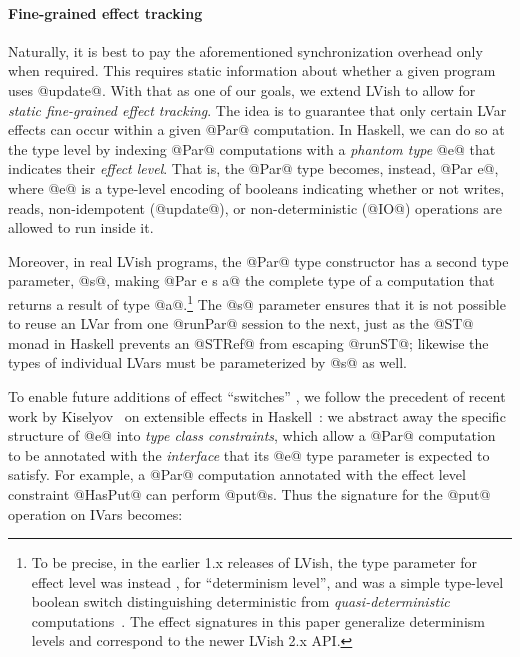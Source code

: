 \paragraph{Fine-grained effect tracking}

Naturally, it is best to pay the aforementioned synchronization
overhead only when required.  This requires static information about
whether a given program uses @update@.  With that as one of our goals, 
we extend LVish
to allow for \emph{static fine-grained effect tracking}.  The idea is
to guarantee that only certain LVar effects can occur within a given
@Par@ computation.  In Haskell, we can do so at the type level
by indexing @Par@ computations with a \emph{phantom type} @e@ that
indicates their \emph{effect level}.  That is, the @Par@ type
 becomes, instead, @Par e@, where @e@ 
is a type-level encoding of booleans indicating whether or not writes,
reads, non-idempotent (@update@), or non-deterministic (@IO@) operations
are allowed to run inside it.

Moreover, in real LVish programs, the @Par@ type constructor has a
second type parameter, @s@, making @Par e s a@ the complete type of a
computation that returns a result of type @a@.\footnote{To be precise,
  in the earlier 1.x releases of LVish, the  type parameter for
  effect level was instead , for ``determinism level'', and was
  a simple type-level boolean switch distinguishing deterministic from
  {\em quasi-deterministic}  computations~\cite{Freeze-paper}.
  The effect signatures in this paper generalize determinism levels
  and correspond to the newer LVish 2.x API.}  The @s@ parameter
ensures that it is not possible to reuse an LVar from one @runPar@
session to the next, just as the @ST@ monad in Haskell prevents an
@STRef@ from escaping @runST@; likewise the types of individual LVars
must be parameterized by @s@ as well.

To enable future additions of effect ``switches'' , we follow the precedent of recent work by Kiselyov \etal~on
extensible effects in Haskell~\cite{oleg-amr-haskell-2013}: we
abstract away the specific structure of @e@ into \emph{type class
  constraints}, which allow a @Par@ computation to be annotated with
the \emph{interface} that its @e@ type parameter is expected to
satisfy.  For example, a @Par@ computation annotated with the effect
level constraint @HasPut@ can perform @put@s.  Thus the signature for
the @put@ operation on IVars becomes:

